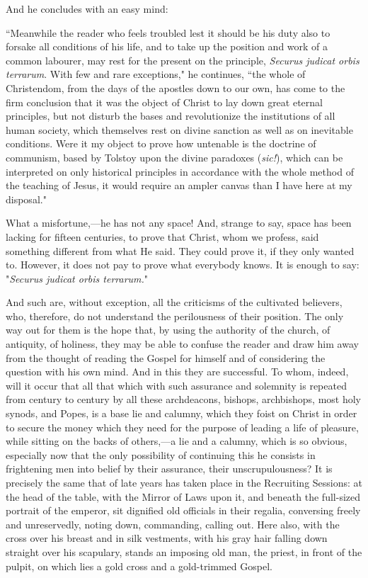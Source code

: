 \documentclass{book}
\begin{document}
And he concludes with an easy mind:

“Meanwhile the reader who feels troubled lest it should be his duty also to forsake all conditions of his life, and to take up the position and work of a common labourer, may rest for the present on the principle, \emph{Securus judicat orbis terrarum}. With few and rare exceptions," he continues, “the whole of Christendom, from the days of the apostles down to our own, has come to the firm conclusion that it was the object of Christ to lay down great eternal principles, but not disturb the bases and revolutionize the institutions of all human society, which themselves rest on divine sanction as well as on inevitable conditions. Were it my object to prove how untenable is the doctrine of communism, based by Tolstoy upon the divine paradoxes (\emph{sic!}), which can be interpreted on only historical principles in accordance with the whole method of the teaching of Jesus, it would require an ampler canvas than I have here at my disposal."

What a misfortune,—he has not any space! And, strange to say, space has been lacking for fifteen centuries, to prove that Christ, whom we profess, said something different from what He said. They could prove it, if they only wanted to. However, it does not pay to prove what everybody knows. It is enough to say: "\emph{Securus judicat orbis terrarum.}"

And such are, without exception, all the criticisms of the cultivated believers, who, therefore, do not understand the perilousness of their position. The only way out for them is the hope that, by using the authority of the church, of antiquity, of holiness, they may be able to confuse the reader and draw him away from the thought of reading the Gospel for himself and of considering the question with his own mind. And in this they are successful. To whom, indeed, will it occur that all that which with such assurance and solemnity is repeated from century to century by all these archdeacons, bishops, archbishops, most holy synods, and Popes, is a base lie and calumny, which they foist on Christ in order to secure the money which they need for the purpose of leading a life of pleasure, while sitting on the backs of others,—a lie and a calumny, which is so obvious, especially now that the only possibility of continuing this he consists in frightening men into belief by their assurance, their unscrupulousness? It is precisely the same that of late years has taken place in the Recruiting Sessions: at the head of the table, with the Mirror of Laws upon it, and beneath the full-sized portrait of the emperor, sit dignified old officials in their regalia, conversing freely and unreservedly, noting down, commanding, calling out. Here also, with the cross over his breast and in silk vestments, with his gray hair falling down straight over his scapulary, stands an imposing old man, the priest, in front of the pulpit, on which lies a gold cross and a gold-trimmed Gospel.
\end{document}
